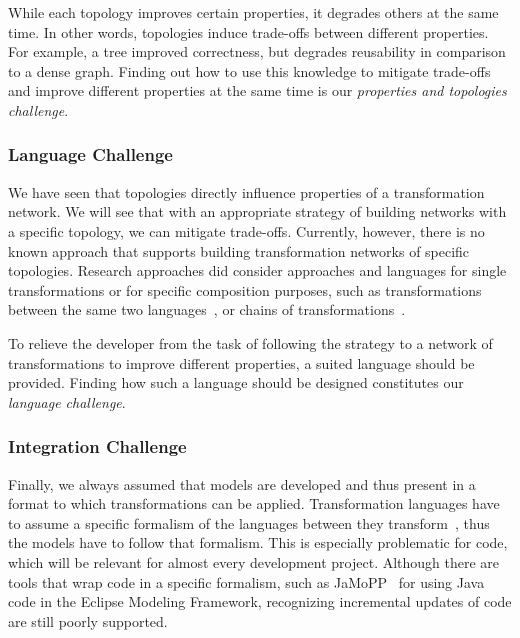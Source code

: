 While each topology improves certain properties, it degrades others at the same time.
In other words, topologies induce trade-offs between different properties.
For example, a tree improved correctness, but degrades reusability in comparison to a dense graph.
Finding out how to use this knowledge to mitigate trade-offs and improve different properties at the same time is our \emph{properties and topologies challenge}.

\subsubsection*{Language Challenge}

We have seen that topologies directly influence properties of a transformation network.
We will see that with an appropriate strategy of building networks with a specific topology, we can mitigate trade-offs.
Currently, however, there is no known approach that supports building transformation networks of specific topologies.
Research approaches did consider approaches and languages for single transformations or for specific composition purposes, such as transformations between the same two languages~\cite{wagelaar2010a,wagelaar2011a}, or chains of transformations~\cite{pilgrim2008a, vanhooff2007UniTI-MODELS}.

To relieve the developer from the task of following the strategy to a network of transformations to improve different properties, a suited language should be provided.
Finding how such a language should be designed constitutes our \emph{language challenge}.

\subsubsection*{Integration Challenge}

Finally, we always assumed that models are developed and thus present in a format to which transformations can be applied.
Transformation languages have to assume a specific formalism of the languages between they transform~\cite{klare2017models}, thus the models have to follow that formalism.
This is especially problematic for code, which will be relevant for almost every development project.
Although there are tools that wrap code in a specific formalism, such as JaMoPP~\cite{heidenreich2009a,heidenreich2010a} for using Java code in the Eclipse Modeling Framework, recognizing incremental updates of code are still poorly supported.

